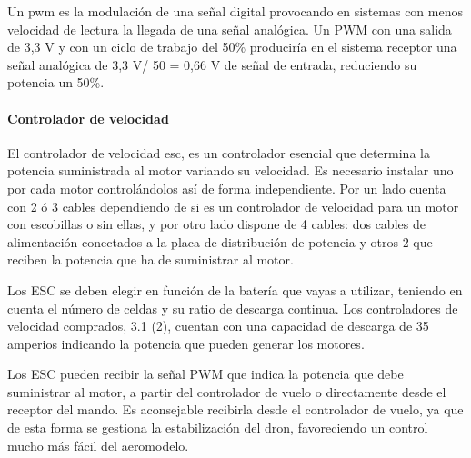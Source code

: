  
 Un \acl{pwm} es la modulación de una señal digital provocando en sistemas con menos velocidad de lectura la llegada de una señal analógica. Un PWM con una salida de 3,3 V y con un ciclo de trabajo del 50\% produciría en el sistema receptor una señal analógica de 3,3 V/ 50 = 0,66 V de señal de entrada, reduciendo su potencia un 50\%.

 
 \paragraph{Controlador de velocidad}
 \label{SSS:Controlador de velocidad}
 


 El controlador de velocidad \acl{esc}, es un controlador esencial que determina la potencia suministrada al motor variando su velocidad. Es necesario instalar uno por cada motor controlándolos así de forma independiente.
 Por un lado cuenta con 2 ó 3 cables dependiendo de si es un controlador de velocidad para un motor con escobillas o sin ellas, y por otro lado dispone de 4 cables: dos cables de alimentación conectados a la placa de distribución de potencia y otros 2 que reciben la potencia que ha de suministrar al motor.
 
 
 Los ESC se deben elegir en función de la batería que vayas a utilizar, teniendo en cuenta el número de celdas y su ratio de descarga continua. Los controladores de velocidad comprados, 3.1 (2), cuentan con una capacidad de descarga de 35 amperios indicando la potencia que pueden generar los motores. 
 
 Los ESC pueden recibir la señal PWM que indica la potencia que debe suministrar al motor, a partir del controlador de vuelo o directamente desde el receptor del mando. Es aconsejable recibirla desde el controlador de vuelo, ya que de esta forma se gestiona la estabilización del dron, favoreciendo un control mucho más fácil del aeromodelo\cite{OscarSerrano}. 

